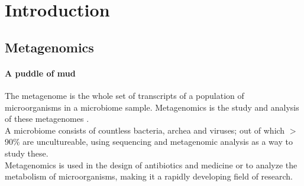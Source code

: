 \documentclass[twocolumn]{bmcart}%
\begin{document}
\begin{frontmatter}
\begin{fmbox}
\begin{abstractbox}
\begin{keyword}
\end{keyword}


\end{abstractbox}
%
\end{fmbox}%

\end{frontmatter}


\section*{Introduction}
\subsection*{Metagenomics}
\paragraph*{A puddle of mud}
The metagenome is the whole set of transcripts of a population of microorganisms in a microbiome sample. Metagenomics is the study and analysis of these metagenomes \cite{handelsman2004metagenomics}.\\
A microbiome consists of countless bacteria, archea and viruses; out of which $>$90\% are uncultureable, using sequencing and metagenomic analysis as a way to study these.\\
Metagenomics is used in the design of antibiotics and medicine or to analyze the metabolism of microorganisms, making it a rapidly developing field of research.
\end{document}
